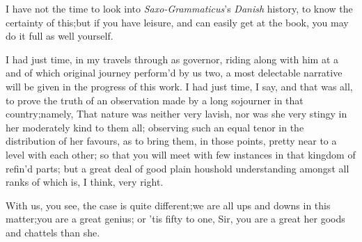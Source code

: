 \documentclass{article}
\begin{document}
I have not the time to look into \textit{Saxo-Grammaticus}’s
\textit{Danish} history, to know the certainty of this;\tsk but if
you have leisure, and can easily get at the book, you may do
it full as well yourself.

I had just time, in my travels through 
as governor, riding along with him at a
and of which original journey
perform’d by us two, a most delectable narrative will be given in
the progress of this work.\break
I had just time, I say, and that was
all, to prove the truth of an observation made by a long sojourner
in that country;\tsh\break namely, \lqq That nature was
neither very lavish, nor was she very stingy in her\break
{}
moderately kind to them all; observing such an equal tenor in
the distribution of her favours, as to bring them, in those points,
pretty near to a level with each other; so that you will meet with
few instances in that kingdom of refin’d parts; but a great
deal of good plain hous\-hold understanding amongst all
ranks of
which is, I think, very right.

With us, you see, the case is quite\break
different;\tsk we are all ups and downs in 
this matter;\tsk you are a great genius;\tsk\break 
or ’tis fifty to one, Sir, you are a great
her goods and chattels than she.
\end{document}
